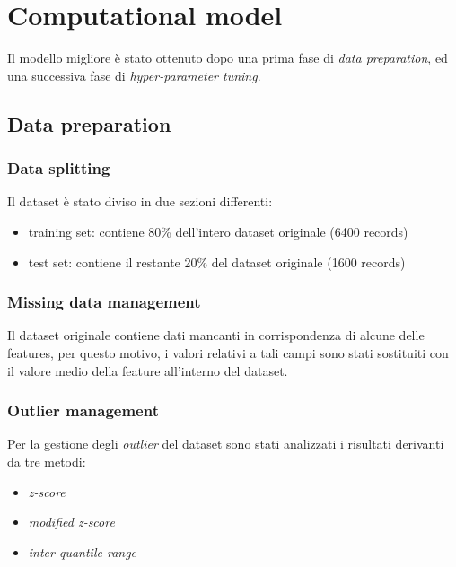\section{Computational model}

        Il modello migliore è stato ottenuto dopo una prima fase di \textit{data preparation}, ed una successiva fase di \textit{hyper-parameter tuning}.

        \subsection{Data preparation}
        
                \subsubsection{Data splitting}
                
                        Il dataset è stato diviso in due sezioni differenti:
                        \begin{itemize}
                                \item training set: contiene 80\% dell'intero dataset originale (6400 records)
                                \item test set: contiene il restante 20\% del dataset originale (1600 records)
                        \end{itemize}
                
                \subsubsection{Missing data management}
                
                        Il dataset originale contiene dati mancanti in corrispondenza di alcune delle features, per questo motivo, i valori relativi a tali campi sono stati sostituiti con il valore medio della feature all'interno del dataset.
                
                \subsubsection{Outlier management}
                
                        Per la gestione degli \textit{outlier} del dataset sono stati analizzati i risultati derivanti da tre metodi:
                        \begin{itemize}
                                \item \textit{z-score}
                                \item \textit{modified z-score}
                                \item \textit{inter-quantile range}
                        \end{itemize}
                    
